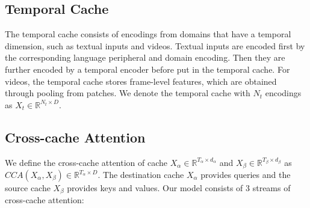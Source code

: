 \documentclass{article}
\begin{document}
\subsection{Temporal Cache}

The temporal cache consists of encodings from domains that have a temporal dimension, such as textual inputs and videos. Textual inputs are encoded first by the corresponding language peripheral and domain encoding. Then they are further encoded by a temporal encoder before put in the temporal cache. For videos, the temporal cache stores frame-level features, which are obtained through pooling from patches. We denote the temporal cache with $N_{t}$ encodings as $X_{t} \in \mathbb{R}^{N_t \times D}$.



\subsection{Cross-cache Attention}

We define the cross-cache attention of cache $X_{\alpha} \in \mathbb{R}^{T_{\alpha} \times d_{\alpha}}$ and $X_{\beta} \in \mathbb{R}^{T_{\beta} \times d_{\beta}}$ as $CCA (X_{\alpha}, X_{\beta}) \in \mathbb{R}^{T_{\alpha} \times D}$. The destination cache $X_{\alpha}$ provides queries and the source cache $X_{\beta}$ provides keys and values. Our model consists of 3 streams of cross-cache attention:

\end{document}
